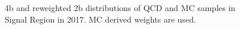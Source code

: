 \begin{figure}[ht]
 

    \caption{4b and reweighted 2b distributions of QCD and \ttbar MC samples in Signal Region in 2017.
             MC derived weights are used.}
    \label{fig:mc-weights-4b-SR-2017}
\end{figure}


